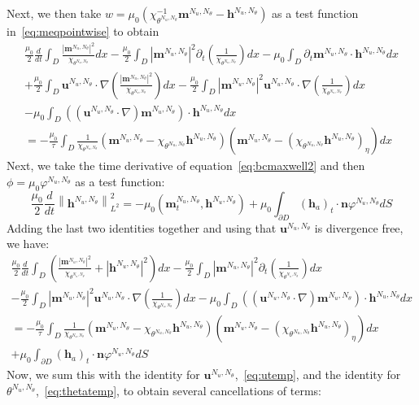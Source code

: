 \documentclass[10pt,letterpaper,twoside]{amsart}
\theoremstyle{definition}{\newtheorem{definition}[lemma]{Definition}}
\theoremstyle{note}{\newtheorem{claim}{Claim}[section]
\newtheorem*{claim*}{Claim}}
\numberwithin{equation}{section}
\newcommand{\dom}{D}
\newcommand{\norm}[1]{\left\| #1 \right\|}
\newcommand{\Grad}{\nabla}
\newcommand{\bmb}{\mathbf{m}^{N_u,N_\theta}}
\newcommand{\bhb}{\mathbf{h}^{N_u,N_\theta}}
\newcommand{\bub}{\mathbf{u}^{N_u,N_\theta}}
\newcommand{\thb}{\theta^{N_u,N_\theta}}
\newcommand{\phb}{\varphi^{N_u,N_\theta}}
\newcommand{\bh}{\mathbf{h}}
\begin{document}
Next, we then take $w=\mu_0(\chi_{\thb}^{-1}\bmb-\bhb)$ as a test function in~\eqref{eq:meqpointwise} to obtain
\begin{multline*}
	\frac{\mu_0}{2}\frac{d}{dt}\int_{\dom} \frac{|\bmb|^2}{\chi_{\thb}} dx - \frac{\mu_0}{2}\int_{\dom} |\bmb|^2 \partial_t\left(\frac{1}{\chi_{\thb}}\right) dx   -\mu_0\int_{\dom} \partial_t \bmb\cdot\bhb dx\\
	 + \frac{\mu_0}{2}\int_{\dom}\bub\cdot \Grad \left(\frac{|\bmb|^2}{\chi_{\thb}}\right) dx 
	-\frac{\mu_0}{2}\int_{\dom} |\bmb|^2 \bub\cdot\Grad\left(\frac{1}{\chi_{\thb}}\right) dx\\
	 - \mu_0\int_{\dom} ((\bub\cdot\Grad)\bmb )\cdot\bhb dx \\
	= - \frac{\mu_0}{\tau}\int_{\dom}\frac{1}{\chi_{\thb}}\left(\bmb-\chi_{\thb}\bhb\right)\left(\bmb-(\chi_{\thb}\bhb)_{\eta}\right) dx 
\end{multline*}
Next, we take the time derivative of equation~\eqref{eq:bcmaxwell2} and then
 $\phi=\mu_0\phb$ as a test function:
 \begin{equation*}
 	\frac{\mu_0}{2}\frac{d}{dt}\norm{\bhb}_{L^2}^2 = -\mu_0(\bmb_t,\bhb) + \mu_0\int_{\partial\dom}(\bh_a)_t\cdot\mathbf{n}\phb dS
 \end{equation*}
 Adding the last two identities together and using that $\bub$ is divergence free, we have:
 \begin{multline*}
 	\frac{\mu_0}{2}\frac{d}{dt}\int_{\dom} \left(\frac{|\bmb|^2}{\chi_{\thb}}+|\bhb|^2\right) dx - \frac{\mu_0}{2}\int_{\dom} |\bmb|^2 \partial_t\left(\frac{1}{\chi_{\thb}}\right) dx   \\
 		-\frac{\mu_0}{2}\int_{\dom} |\bmb|^2 \bub\cdot\Grad\left(\frac{1}{\chi_{\thb}}\right) dx
  - \mu_0\int_{\dom} ((\bub\cdot\Grad)\bmb )\cdot\bhb dx \\
 	= - \frac{\mu_0}{\tau}\int_{\dom}\frac{1}{\chi_{\thb}}\left(\bmb-\chi_{\thb}\bhb\right)\left(\bmb-(\chi_{\thb}\bhb)_{\eta}\right) dx \\
 	+\mu_0\int_{\partial\dom}(\bh_a)_t\cdot\mathbf{n}\phb dS
 \end{multline*}
 Now, we sum  this with the identity for $\bub$,~\eqref{eq:utemp}, and the identity for $\thb$,~\eqref{eq:thetatemp}, to obtain several cancellations of terms:
\end{document}
